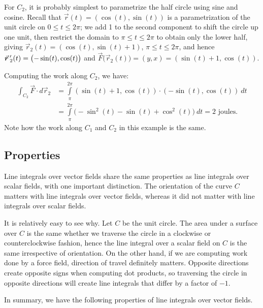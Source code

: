 \begin{example}
For $C_2$, it is probably simplest to parametrize the half circle using sine and cosine. Recall that $\vec r(t) = \left( \cos(t), \sin(t)\right)$ is a parametrization of the unit circle on $0\leq t\leq 2\pi$; we add 1 to the second component to shift the circle up one unit, then restrict the domain to $\pi\leq t\leq 2\pi$  to obtain only the lower half, giving $\vec r_2(t) = \left( \cos(t), \sin(t)+1\right)$, $\pi\leq t\leq 2\pi$, and hence $\vrp_2(t) = \left( -\sin(t), \cos(t)\right)$ and $\vec F\big(\vec r_2(t)\big) = \left(y,x\right) = \left( \sin(t)+1,\cos(t)\right)$.


Computing the work along $C_2$, we have:
\begin{align*}
\int_{C_2} \vec F\cdot d\vec r_2 & = \int\limits_{\pi}^{2\pi} \left( \sin(t)+1,\cos(t)\right)\cdot\left( -\sin(t),\cos(t)\right)\ dt \\
		&= \int\limits_{\pi}^{2\pi} \big(-\sin^2(t)-\sin(t)+\cos^2(t)\big)\ dt = 2 \text{ joules}.
\end{align*}
Note how the work along $C_1$ and $C_2$ in this example is the same. 
\end{example}

\subsection{Properties}
Line integrals over vector fields share the same properties as line integrals over scalar fields, with one important distinction. The orientation of the curve $C$ matters with line integrals over vector fields, whereas it did not matter with line integrals over scalar fields.

It is relatively easy to see why. Let $C$ be the unit circle. The area under a surface over $C$ is the same whether we traverse the circle in a clockwise or counterclockwise fashion, hence the line integral over a scalar field on $C$ is the same irrespective of orientation. On the other hand, if we are computing work done by a force field, direction of travel definitely matters. Opposite directions create opposite signs when computing dot products, so traversing the circle in opposite directions will create line integrals that differ by a factor of $-1$. 

In summary, we have the following properties of line integrals over vector fields. 

